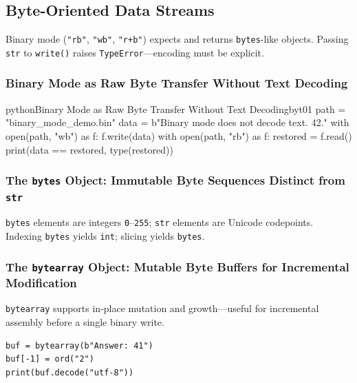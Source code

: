 \subsection{Byte-Oriented Data Streams}

Binary mode (\texttt{"rb"}, \texttt{"wb"}, \texttt{"r+b"}) expects and returns \texttt{bytes}-like objects. Passing \texttt{str} to \texttt{write()} raises \texttt{TypeError}---encoding must be explicit.

\subsubsection{Binary Mode as Raw Byte Transfer Without Text Decoding}

\begin{codebox}[]{python}{Binary Mode as Raw Byte Transfer Without Text Decoding}{byt01}
path = "binary_mode_demo.bin"
data = b"Binary mode does not decode text. 42.\n"
with open(path, "wb") as f:
    f.write(data)
with open(path, "rb") as f:
    restored = f.read()
print(data == restored, type(restored))
\end{codebox}


\subsubsection{The \texttt{bytes} Object: Immutable Byte Sequences Distinct from \texttt{str}}

\texttt{bytes} elements are integers \texttt{0}--\texttt{255}; \texttt{str} elements are Unicode codepoints. Indexing \texttt{bytes} yields \texttt{int}; slicing yields \texttt{bytes}.

\subsubsection{The \texttt{bytearray} Object: Mutable Byte Buffers for Incremental Modification}

\texttt{bytearray} supports in-place mutation and growth---useful for incremental assembly before a single binary write.

\begin{verbatim}
buf = bytearray(b"Answer: 41")
buf[-1] = ord("2")
print(buf.decode("utf-8"))
\end{verbatim}
